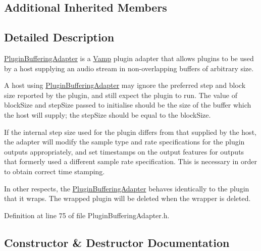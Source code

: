 \subsection*{Additional Inherited Members}


\subsection{Detailed Description}
\hyperlink{class_vamp_1_1_host_ext_1_1_plugin_buffering_adapter}{Plugin\+Buffering\+Adapter} is a \hyperlink{namespace_vamp}{Vamp} plugin adapter that allows plugins to be used by a host supplying an audio stream in non-\/overlapping buffers of arbitrary size.

A host using \hyperlink{class_vamp_1_1_host_ext_1_1_plugin_buffering_adapter}{Plugin\+Buffering\+Adapter} may ignore the preferred step and block size reported by the plugin, and still expect the plugin to run. The value of block\+Size and step\+Size passed to initialise should be the size of the buffer which the host will supply; the step\+Size should be equal to the block\+Size.

If the internal step size used for the plugin differs from that supplied by the host, the adapter will modify the sample type and rate specifications for the plugin outputs appropriately, and set timestamps on the output features for outputs that formerly used a different sample rate specification. This is necessary in order to obtain correct time stamping.

In other respects, the \hyperlink{class_vamp_1_1_host_ext_1_1_plugin_buffering_adapter}{Plugin\+Buffering\+Adapter} behaves identically to the plugin that it wraps. The wrapped plugin will be deleted when the wrapper is deleted. 

Definition at line 75 of file Plugin\+Buffering\+Adapter.\+h.



\subsection{Constructor \& Destructor Documentation}
